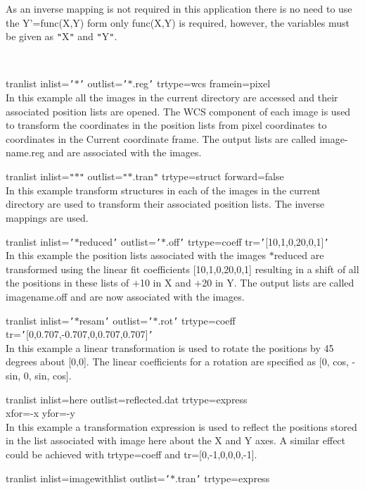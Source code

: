 \documentclass[twoside,11pt]{article}
\renewcommand{\_}{\texttt{\symbol{95}}}
\newcommand{\qt}[1]{{\tt "}#1{\tt "}}
\newcommand{\qs}[1]{{\tt '}#1{\tt '}}
\newcommand{\sstexamples}[1]{
   \item[Examples:] \mbox{} \\
   \vspace{-3.5ex}
   \begin{description}
      #1
   \end{description}
}
\newcommand{\sstexamplesubsection}[2]{\sloppy \item{\ssttt #1} \mbox{} \\ #2 }
\newcommand{\sstexamples}[1]{
      \item[Examples:] \\
      \begin{description}
         #1
      \end{description}
      \\
   }
\newcommand{\sstexamplesubsection}[2]{\item[{\ssttt #1}] #2}
\begin{document}
{{{         As an inverse mapping is not required in this application
         there is no need to use the Y'=func(X,Y) form only func(X,Y)
         is required, however, the variables must be given as
         \qt{X} and \qt{Y}.
      }
   }
   \sstexamples{
      \sstexamplesubsection{
         tranlist inlist=\qs{$*$} outlist=\qs{$*$.reg} trtype=wcs
                  framein=pixel
      }{
         In this example all the images in the current directory are
         accessed and their associated position lists are opened.
         The WCS component of each image is used to transform the
         coordinates in the position lists from pixel coordinates to
         coordinates in the Current coordinate frame.  The output
         lists are called image-name.reg and are associated with the
         images.
      }
      \sstexamplesubsection{
         tranlist inlist=\qt{$*$} outlist=\qt{$*$.tran} trtype=struct 
                  forward=false
      }{
         In this example transform structures in each of the images in
         the current directory are used to transform their associated
         position lists.  The inverse mappings are used.
      }
      \sstexamplesubsection{
         tranlist inlist=\qs{$*$\_reduced} outlist=\qs{$*$.off} trtype=coeff
               tr=\qs{[10,1,0,20,0,1]}
      }{
         In this example the position lists associated with the images
         $*$\_reduced are transformed using the linear fit coefficients
         [10,1,0,20,0,1] resulting in a shift of all the positions in
         these lists of $+$10 in X and $+$20 in Y. The output lists are
         called image\_name.off and are now associated with the images.
      }
      \sstexamplesubsection{
         tranlist inlist=\qs{$*$\_resam} outlist=\qs{$*$.rot} trtype=coeff
               tr=\qs{[0,0.707,-0.707,0,0.707,0.707]}
      }{
         In this example a linear transformation is used to rotate the
         positions by 45 degrees about [0,0]. The linear coefficients
         for a rotation are specified as [0, cos, -sin, 0, sin, cos].
      }
      \sstexamplesubsection{
         tranlist inlist=here outlist=reflected.dat trtype=express \\
               xfor=-x yfor=-y
      }{
         In this example a transformation expression is used to reflect
         the positions stored in the list associated with image here
         about the X and Y axes. A similar effect could be achieved
         with trtype=coeff and tr=[0,-1,0,0,0,-1].
      }
      \sstexamplesubsection{
         tranlist inlist=image\_with\_list outlist=\qs{$*$.tran} trtype=express
}}}
\end{document}

